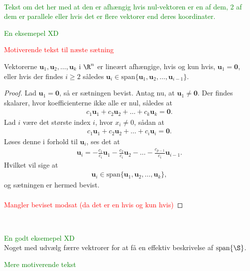 %
\\
%
\textcolor{green}{Tekst om det her med at den er afhængig hvis nul-vektoren er en af dem, 2 af dem er parallele eller hvis det er flere vektorer end deres koordinater.}
\\
%
\begin{eks}
\textcolor{green}{En eksemepel XD}
\end{eks}
%
\textcolor{red}{Motiverende tekst til næste sætning}
%
\begin{thm}{}{}
%
Vektorerne $\mathbf{u}_1,\mathbf{u}_2, \ldots ,\mathbf{u}_k$ i $\R^n$ er lineært afhængige, 
hvis og kun hvis, $\mathbf{u}_1=\mathbf{0}$, eller hvis der findes $i \geq 2$ således $\mathbf{u}_i \in \text{span} \{ \mathbf{u}_1,\mathbf{u}_2, \ldots ,\mathbf{u}_{i-1} \}$.
%
\end{thm}
%
\begin{proof}
%
Lad $\mathbf{u}_1=\mathbf{0}$, så er sætningen bevist. 
Antag nu, at $\mathbf{u}_1 \neq \mathbf{0}$. 
Der findes skalarer, hvor koefficienterne ikke alle er nul, således at
% 
\begin{align*}
c_1 \mathbf{u}_1 + c_2 \mathbf{u}_2 + \ldots + c_k \mathbf{u}_k = \mathbf{0}.
\end{align*}
%
Lad $i$ være det største index $i$, hvor $x_i \neq 0$, sådan at 
\begin{align*}
c_1 \mathbf{u}_1 + c_2 \mathbf{u}_2 + \ldots + c_i \mathbf{u}_i = \mathbf{0}.
\end{align*}
Løses denne i forhold til $\mathbf{u}_i$, ses det at
\begin{align*}
\mathbf{u}_i = - \frac{c_1}{c_i} \mathbf{u}_1 - \frac{c_2}{c_i} \mathbf{u}_2 - \ldots - \frac{c_{p-1}}{c_i} \mathbf{u}_{i-1}.
\end{align*}
Hvilket vil sige at 
\begin{align*}
\mathbf{u}_i \in \text{span}\{ \mathbf{u}_1,\mathbf{u}_2, \ldots ,\mathbf{u}_k \},
\end{align*}
%
og sætningen er hermed bevist.
%
\\\\
\textcolor{red}{Mangler beviset modsat (da det er en hvis og kun hvis)}
%
\end{proof}
\\
%
%
\begin{eks}
\textcolor{green}{En godt eksemepel XD} 
\\
Noget med udvælg færre vektrorer for at få en effektiv beskrivelse af $\text{span}\{\S\}$.
\end{eks}
%
\textcolor{green}{Mere motiverende tekst}